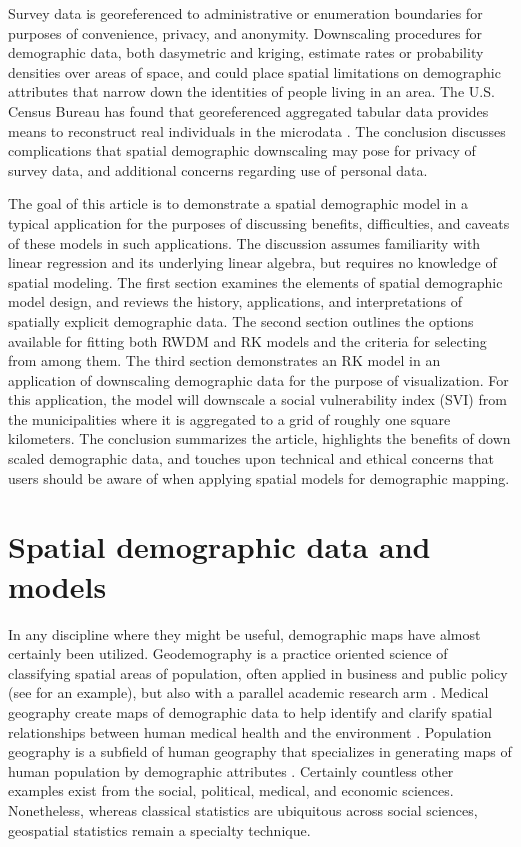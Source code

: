 Survey data is georeferenced to administrative or enumeration boundaries for purposes of convenience, privacy, and anonymity.  Downscaling procedures for demographic data, both dasymetric and kriging, estimate rates or probability densities over areas of space, and could place spatial limitations on demographic attributes that narrow down the identities of people living in an area.  The U.S. Census Bureau has found that georeferenced aggregated tabular data provides means to reconstruct real individuals in the microdata \citep{abowd18, abowd19}.  The conclusion discusses complications that spatial demographic downscaling may pose for privacy of survey data, and additional concerns regarding use of personal data.

The goal of this article is to demonstrate a spatial demographic model in a typical application for the purposes of discussing benefits, difficulties, and caveats of these models in such applications.  The discussion assumes familiarity with linear regression and its underlying linear algebra, but requires no knowledge of spatial modeling.  The first section examines the elements of spatial demographic model design, and reviews the history, applications, and interpretations of spatially explicit demographic data.  The second section outlines the options available for fitting both RWDM and RK models and the criteria for selecting from among them.  The third section demonstrates an RK model in an application of downscaling demographic data for the purpose of visualization.  For this application, the model will downscale a social vulnerability index (SVI) from the municipalities where it is aggregated to a grid of roughly one square kilometers.  The conclusion summarizes the article, highlights the benefits of down scaled demographic data, and touches upon technical and ethical concerns that users should be aware of when applying spatial models for demographic mapping.


\section{Spatial demographic data and models}

In any discipline where they might be useful, demographic maps have almost certainly been utilized.  Geodemography is a practice oriented science of classifying spatial areas of population, often applied in business and public policy (see \citep{acorn} for an example), but also with a parallel academic research arm \citep{oacug, pwnation, singleton14}.  Medical geography create maps of demographic data to help identify and clarify spatial relationships between human medical health and the environment \citep{brown09}.  Population geography is a subfield of human geography that specializes in generating maps of human population by demographic attributes \citep{bailey05}.  Certainly countless other examples exist from the social, political, medical, and economic sciences.  Nonetheless, whereas classical statistics are ubiquitous across social sciences, geospatial statistics remain a specialty technique.

